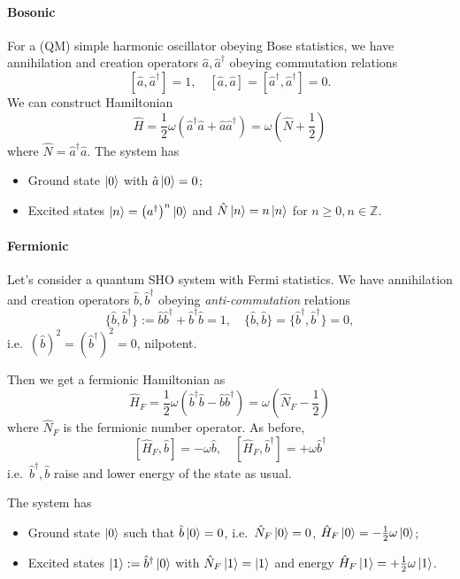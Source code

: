 \documentclass[a4paper,11pt]{article}
\begin{document}
	\paragraph{Bosonic} For a (QM) simple harmonic oscillator obeying Bose statistics, we have annihilation and creation operators $\hat a, \hat a^{\dagger}$ obeying commutation relations 
	\[
		[\hat a, \hat a^{\dagger}] = 1, \quad [\hat a,\hat a] = [\hat a^{\dagger},\hat a^{\dagger}] = 0.
	\]
	We can construct Hamiltonian 
	\[
		\hat H = \frac{1}{2} \omega (\hat a^{\dagger}\hat a + \hat a \hat a^{\dagger}) = \omega \left(\hat N + \frac{1}{2}\right)
	\]
	where $\hat N = \hat a^{\dagger} \hat a$.
	The system has 
	\begin{itemize}
		\item Ground state $\ket{0}$ with $\hat a \ket{0} = 0$;
		\item Excited states $\ket{n} = \left( a^{\dagger} \right)^n \ket{0}$ and $\hat N \ket{n} = n \ket{n}$ for $n \geq 0, n \in \mathbb{Z}$.
	\end{itemize}
	
	\paragraph{Fermionic} Let's consider a quantum SHO system with Fermi statistics. We have annihilation and creation operators $\hat b,\hat b^{\dagger}$ obeying \emph{anti-commutation} relations
	\[
		\{\hat b, \hat b^{\dagger}\} := \hat b \hat b^{\dagger} + \hat b^{\dagger} \hat b = 1, \quad \{\hat b, \hat b\} = \{\hat b^{\dagger}, \hat b^{\dagger}\} = 0,
	\]
	i.e.\ $(\hat b)^2 = (\hat b^{\dagger})^2 = 0$, nilpotent.
	
	Then we get a fermionic Hamiltonian as 
	\[
		\hat H_F = \frac{1}{2} \omega \left( \hat b^{\dagger} \hat b - \hat b \hat b^{\dagger} \right) = \omega \left(\hat N_F - \frac{1}{2}\right)
	\]
	where $\hat N_F$ is the fermionic number operator. As before, 
	\[
		[\hat H_F, \hat b] = - \omega \hat b, \quad [\hat H_F, \hat b^{\dagger}] = + \omega \hat b^{\dagger}
	\]
	i.e.\ $\hat b^{\dagger},\hat b$ raise and lower energy of the state as usual. 

	The system has 
	\begin{itemize}
		\item Ground state $\ket{0}$ such that $\hat b \ket{0} = 0$, i.e.\ $\hat N_F \ket{0} = 0$, $\hat H_F \ket{0} = - \frac{1}{2} \omega \ket{0}$;
		\item Excited states $\ket{1} := \hat b^{\dagger} \ket{0}$ with $\hat N_F \ket{1} = \ket{1}$ and energy $\hat H_F \ket{1} = + \frac{1}{2} \omega \ket{1}$.
	\end{itemize}
	
\end{document}
